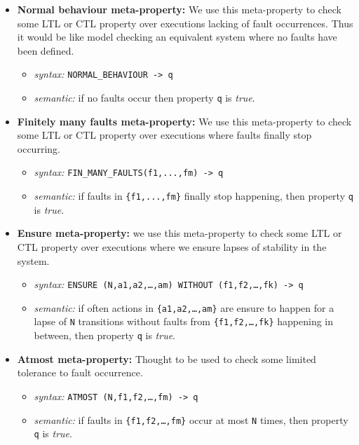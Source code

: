 \documentclass[12pt]{article}
\begin{document}
\begin{itemize}
\item \textbf{Normal behaviour meta-property:} We use this meta-property to check some LTL or CTL property over executions lacking of fault occurrences. Thus it would be like model checking an equivalent system where no faults have been defined.
\begin{itemize}
\item \textit{syntax: } \texttt{NORMAL\_BEHAVIOUR -> q}
\item \textit{semantic: } if no faults occur then property \texttt{q} is \textit{true}.
\end{itemize}
\item \textbf{Finitely many faults meta-property:} We use this meta-property to check some LTL or CTL property over executions where faults finally stop occurring.
\begin{itemize}
\item \textit{syntax: } \texttt{FIN\_MANY\_FAULTS(f1,...,fm) -> q}
\item \textit{semantic: } if faults in \texttt{\{f1,...,fm\}} finally stop happening, then property \texttt{q} is \textit{true}.
\end{itemize}
\item \textbf{Ensure meta-property:} we use this meta-property to check some LTL or CTL property over executions where we ensure lapses of stability in the system.
\begin{itemize}
\item \textit{syntax: } \texttt{ENSURE (N,a1,a2,\ldots,am) WITHOUT (f1,f2,\ldots,fk) -> q}
\item \textit{semantic: } if often actions in \texttt{\{a1,a2,\ldots,am\}} are ensure to happen for a lapse of \texttt{N} transitions without faults from \texttt{\{f1,f2,\ldots,fk\}} happening in between, then property \texttt{q} is \textit{true}.
\end{itemize}
\item \textbf{Atmost meta-property:} Thought to be used to check some limited tolerance to fault occurrence.
\begin{itemize}
\item \textit{syntax: } \texttt{ATMOST (N,f1,f2,\ldots,fm) -> q}
\item \textit{semantic: } if faults in \texttt{\{f1,f2,\ldots,fm\}} occur at most \texttt{N} times, then property \texttt{q} is \textit{true}.
\end{itemize}
\end{itemize}
\end{document}

